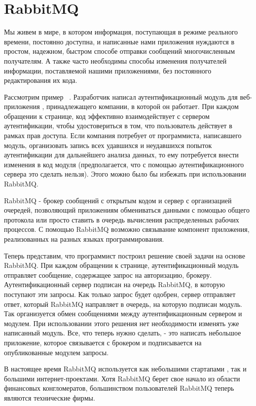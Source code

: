 \chapter{RabbitMQ} %
\label{sec:examples}
Мы живем в мире, в котором информация, поступающая в режиме реального времени, постоянно доступна, и написанные нами приложения нуждаются в простом, надежном, быстром способе отправки сообщений многочисленным получателям. А также часто необходимы способы изменения получателей информации, поставляемой нашими приложениями, без постоянного редактирования их кода.\par
Рассмотрим пример ~\cite{rabbitmq_in_action}. Разработчик написал аутентификационный модуль для веб-приложения , принадлежащего компании, в которой он работает. При каждом обращении к странице, код эффективно взаимодействует с сервером аутентификации, чтобы удостовериться в том, что пользователь действует в рамках прав доступа. Если компания потребует от программиста, написавшего модуль, организовать запись всех удавшихся и неудавшихся попыток аутентификации для дальнейшего анализа данных, то ему потребуется внести изменения в код модуля (предполагается, что с помощью аутентификационного сервера это сделать нельзя). Этого можно было бы избежать при использовании RabbitMQ.\par 
RabbitMQ - брокер сообщений с открытым кодом и сервер с организацией очередей, позволяющий приложениям обмениваться данными с помощью общего протокола или просто ставить в очередь вычисления распределенных рабочих процессов. С помощью RabbitMQ возможно связывание компонент приложения, реализованных на разных языках программирования.\par 
 Теперь представим, что программист построил решение своей задачи на основе RabbitMQ. При каждом обращении к странице, аутентификационный модуль отправляет сообщение, содержащее запрос на авторизацию, брокеру. Аутентификационный сервер подписан на очередь RabbitMQ, в которую поступают эти запросы. Как только запрос будет одобрен, сервер отправляет ответ, который RabbitMQ направляет в очередь, на которую подписан модуль. Так организуется обмен сообщениями между аутентификационным сервером и модулем. При использовании этого решения нет необходимости изменять уже написанный модуль.  Все, что теперь нужно сделать, - это написать небольшое приложение, которое связывается с брокером и подписывается на опубликованные модулем запросы.\par
В настоящее время RabbitMQ используется как небольшими стартапами , так и большими интернет-проектами. Хотя RabbitMQ берет свое начало из области финансовых конгломератов, большинством пользователей RabbitMQ теперь являются технические фирмы.\par 

